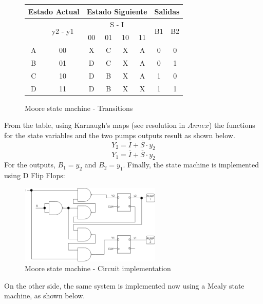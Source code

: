 \begin{figure}[H]
\begin{centering}
\begin{tabular}{|c|c|c|c|c|c||c|c|}
    \hline 
    \multicolumn{2}{|c|}{Estado Actual} & \multicolumn{4}{c||}{Estado Siguiente} & \multicolumn{2}{c|}{Salidas}\tabularnewline
    \hline 
    \hline 
    \multirow{2}{*}{} & \multirow{2}{*}{y2 - y1} & \multicolumn{4}{c||}{S - I} & \multirow{2}{*}{B1} & \multirow{2}{*}{B2}\tabularnewline
    \cline{3-6} 
     &  & 00 & 01 & 10 & 11 &  & \tabularnewline
    \hline 
    A & 00 & X & C & X & A & 0 & 0\tabularnewline
    \hline 
    B & 01 & D & C & X & A & 0 & 1\tabularnewline
    \hline 
    C & 10 & D & B & X & A & 1 & 0\tabularnewline
    \hline 
    D & 11 & D & B & X & X & 1 & 1\tabularnewline
    \hline 
    \end{tabular}
    \caption{Moore state machine - Transitions}
\end{centering}
\end{figure}

\newpage

From the table, using Karnaugh's maps (see resolution in $Annex$) the 
functions for the state variables and the 
two pumps outputs result as shown below.
$$Y_2 = \overline{I} + \overline{S} \cdot \overline{y_2}$$ 
$$Y_1 = \overline{I} + \overline{S} \cdot y_2$$ 
For the outputs, $B_1 = y_2$ and $B_2 = y_1$.  
Finally, the state machine is implemented using 
D Flip Flops:

\begin{figure}[H]
    \begin{centering}
    \includegraphics[width=0.6\textwidth]{data/Graficos1/1a_Compuertas_Moore.png}
    \par\end{centering}
    \caption{Moore state machine - Circuit implementation}
\end{figure}

On the other side, the same system is implemented 
now using a Mealy state machine, as shown below.

